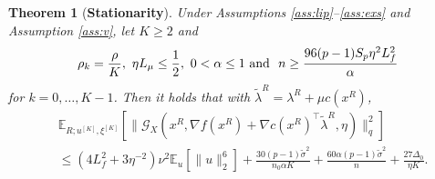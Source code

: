 \documentclass[11pt]{article}
\newtheorem{theorem}{Theorem}[section]
\numberwithin{equation}{section}
\newcommand{\E}{\mathbb{E}}
\newcommand{\be}{\begin{equation}}
\newcommand{\ee}{\end{equation}}
\newcommand{\bee}{\begin{equation*}}
\newcommand{\eee}{\end{equation*}}
\begin{document}
\begin{theorem}[{\bf {Stationarity}}]\label{stationary}
     Under Assumptions \ref{ass:lip}--\ref{ass:exs} and Assumption \ref{ass:v}, let \(K\ge2\) and 
    \bee
     \rho_k = \frac{\rho}{K},\ \eta L_\mu \leq \frac{1}{2},\ 0<\alpha\le1~{\rm and}~\ n \ge \frac{96(p-1)S_p\eta^2L_f^2}{\alpha} 
    \eee
    for $k=0,\ldots, K-1$. 
    Then it holds that with \(\tilde \lambda^R = \lambda^R + \mu c(x^R)\),
    \be \label{bound}
    \begin{aligned}
        &\E_{R;u^{[K]},\xi^{[K]}}  [\|\mathcal{G}_X (x^R,\nabla f(x^R) + \nabla c(x^R)^\top\tilde \lambda^R,\eta)\|_q^2 ] \\
        & \leq (4L_f^2+3\eta^{-2})\nu^2 \E_u[\|u\|_2^6] +\frac{30(p-1)\tilde \sigma^2}{n_0 \alpha K}+\frac{60\alpha (p -1)\tilde \sigma^2}{n} +\frac{27 \Delta_0}{ \eta K}.
    \end{aligned}
    \ee 
\end{theorem}
\end{document}
